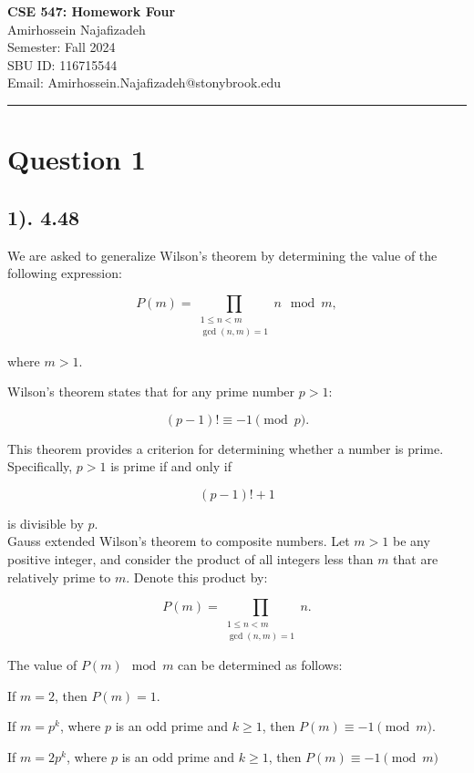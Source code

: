 \documentclass[12pt]{article}
\begin{document}
\begin{center}
    {\LARGE\textbf{CSE 547: Homework Four}} \\[1em]
    {\large Amirhossein Najafizadeh} \\[1em]
    Semester: Fall 2024 \\ 
    SBU ID: 116715544 \\
    Email: Amirhossein.Najafizadeh@stonybrook.edu \\[1em]
    \noindent\rule{\textwidth}{0.6pt}
\end{center}

\section*{Question 1}
\subsection*{1). 4.48}  
We are asked to generalize Wilson's theorem by determining the value of the following expression:

\[
P(m) = \prod_{\substack{1 \leq n < m \\ \gcd(n,m) = 1}} n \mod m,
\]

where \( m > 1 \).

Wilson's theorem states that for any prime number \( p > 1 \):

\[
(p - 1)! \equiv -1 \pmod{p}.
\]

This theorem provides a criterion for determining whether a number is prime. Specifically, \( p > 1 \) is prime if and only if

\[
(p - 1)! + 1
\]

is divisible by \( p \).\\

Gauss extended Wilson's theorem to composite numbers. Let \( m > 1 \) be any positive integer, and consider the product of all integers less than \( m \) that are relatively prime to \( m \). Denote this product by:

\[
P(m) = \prod_{\substack{1 \leq n < m \\ \gcd(n,m) = 1}} n.
\]

The value of \( P(m) \mod m \) can be determined as follows:

If \( m = 2 \), then \( P(m) = 1 \).

If \( m = p^k \), where \( p \) is an odd prime and \( k \geq 1 \), then \( P(m) \equiv -1 \pmod{m} \).

If \( m = 2p^k \), where \( p \) is an odd prime and \( k \geq 1 \), then \( P(m) \equiv -1 \pmod{m} \)
\end{document}
